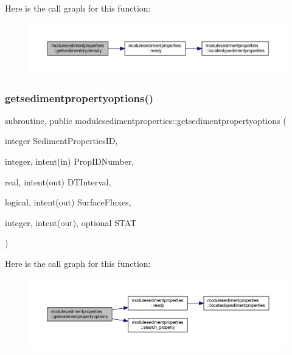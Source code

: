 Here is the call graph for this function\+:\nopagebreak
\begin{figure}[H]
\begin{center}
\leavevmode
\includegraphics[width=350pt]{namespacemodulesedimentproperties_ac8feadd6cbbbb852c325a183475aaa8c_cgraph}
\end{center}
\end{figure}
\mbox{\label{namespacemodulesedimentproperties_a140a456cc243156f2a6bc2d18fc0a834}} 
\subsubsection{\texorpdfstring{getsedimentpropertyoptions()}{getsedimentpropertyoptions()}}
{\footnotesize\ttfamily subroutine, public modulesedimentproperties\+::getsedimentpropertyoptions (\begin{DoxyParamCaption}\item[{integer}]{Sediment\+Properties\+ID,  }\item[{integer, intent(in)}]{Prop\+I\+D\+Number,  }\item[{real, intent(out)}]{D\+T\+Interval,  }\item[{logical, intent(out)}]{Surface\+Fluxes,  }\item[{integer, intent(out), optional}]{S\+T\+AT }\end{DoxyParamCaption})}

Here is the call graph for this function\+:\nopagebreak
\begin{figure}[H]
\begin{center}
\leavevmode
\includegraphics[width=350pt]{namespacemodulesedimentproperties_a140a456cc243156f2a6bc2d18fc0a834_cgraph}
\end{center}
\end{figure}
\mbox{\label{namespacemodulesedimentproperties_a69dda6f50e9b65498825a76aa325a968}} 
